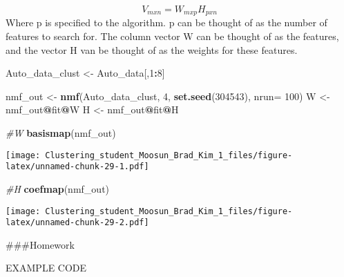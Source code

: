 \documentclass[11pt,]{article}
\newenvironment{Shaded}{\begin{snugshade}}{\end{snugshade}}
\newcommand{\CommentTok}[1]{\textcolor[rgb]{0.56,0.35,0.01}{\textit{#1}}}
\newcommand{\DataTypeTok}[1]{\textcolor[rgb]{0.13,0.29,0.53}{#1}}
\newcommand{\DecValTok}[1]{\textcolor[rgb]{0.00,0.00,0.81}{#1}}
\newcommand{\KeywordTok}[1]{\textcolor[rgb]{0.13,0.29,0.53}{\textbf{#1}}}
\newcommand{\NormalTok}[1]{#1}
\newcommand{\OperatorTok}[1]{\textcolor[rgb]{0.81,0.36,0.00}{\textbf{#1}}}
\newcommand{\StringTok}[1]{\textcolor[rgb]{0.31,0.60,0.02}{#1}}
\begin{document}
\[V_{mxn}=W_{mxp}H_{pxn}\] Where p is specified to the algorithm. p can
be thought of as the number of features to search for. The column vector
W can be thought of as the features, and the vector H van be thought of
as the weights for these features.

\begin{Shaded}
\begin{Highlighting}[]
\NormalTok{Auto_data_clust <-}\StringTok{ }\NormalTok{Auto_data[,}\DecValTok{1}\OperatorTok{:}\DecValTok{8}\NormalTok{]}

\NormalTok{nmf_out <-}\StringTok{ }\KeywordTok{nmf}\NormalTok{(Auto_data_clust, }\DecValTok{4}\NormalTok{, }\KeywordTok{set.seed}\NormalTok{(}\DecValTok{304543}\NormalTok{), }\DataTypeTok{nrun=} \DecValTok{100}\NormalTok{)}
\NormalTok{W <-}\StringTok{ }\NormalTok{nmf_out}\OperatorTok{@}\NormalTok{fit}\OperatorTok{@}\NormalTok{W}
\NormalTok{H <-}\StringTok{ }\NormalTok{nmf_out}\OperatorTok{@}\NormalTok{fit}\OperatorTok{@}\NormalTok{H}

\CommentTok{#W}
\KeywordTok{basismap}\NormalTok{(nmf_out)}
\end{Highlighting}
\end{Shaded}

\texttt{[image: Clustering\_student\_Moosun\_Brad\_Kim\_1\_files/figure-latex/unnamed-chunk-29-1.pdf]}

\begin{Shaded}
\begin{Highlighting}[]
\CommentTok{#H}
\KeywordTok{coefmap}\NormalTok{(nmf_out)}
\end{Highlighting}
\end{Shaded}

\texttt{[image: Clustering\_student\_Moosun\_Brad\_Kim\_1\_files/figure-latex/unnamed-chunk-29-2.pdf]}
\newpage

\#\#\#Homework

EXAMPLE CODE
\end{document}
